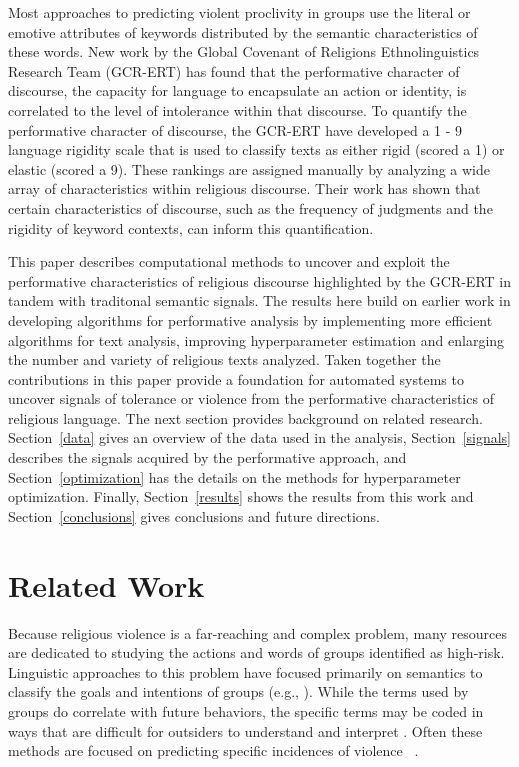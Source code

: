 \documentclass[11pt, a4paper]{article}
\begin{document}
Most approaches to predicting violent proclivity in groups use the literal or emotive attributes of keywords distributed by the semantic characteristics of these words. New work by  the Global Covenant of Religions Ethnolinguistics Research Team (GCR-ERT) has found that the performative character of discourse, the capacity for language to encapsulate an action or identity, is correlated to the level of intolerance within that discourse. To quantify the performative character of discourse, the GCR-ERT have developed a 1 - 9 language rigidity scale that is used to classify texts as either rigid (scored a 1) or elastic (scored a 9). These rankings are assigned manually by analyzing a wide array of characteristics within religious discourse.  Their work has shown that certain characteristics of discourse, such as the frequency of judgments and the rigidity of keyword contexts, can inform this quantification. 

This paper describes computational methods to uncover and exploit the performative characteristics of religious discourse highlighted by the GCR-ERT in tandem with traditonal semantic signals.  The results here build on earlier work in developing algorithms for performative analysis by implementing more efficient algorithms for text analysis,  improving hyperparameter estimation and enlarging the number and variety of religious texts analyzed. Taken together the contributions in this paper provide a foundation for automated systems to uncover signals of tolerance or violence from the performative characteristics of religious language. The next section provides background on related research. Section~\ref{data} gives an overview of the data used in the analysis, Section~\ref{signals} describes the signals acquired by the performative approach, and Section~\ref{optimization} has the details on the methods for hyperparameter optimization. Finally, Section~\ref{results} shows the results from this work and Section~\ref{conclusions} gives conclusions and future directions.  

\section{Related Work}\label{relatedwork}

Because religious violence is a far-reaching and complex problem, many resources are dedicated to studying the actions and words of groups identified as high-risk. Linguistic approaches to this problem have focused primarily on semantics to classify the goals and intentions of groups (e.g., \cite{brett2005}). While the terms used by groups do correlate with future behaviors, the specific terms may be coded in ways that are difficult for outsiders to understand and interpret \cite{hassner2009}. Often these methods are focused on predicting specific incidences of violence ~\cite{Yang2010}.
\end{document}
